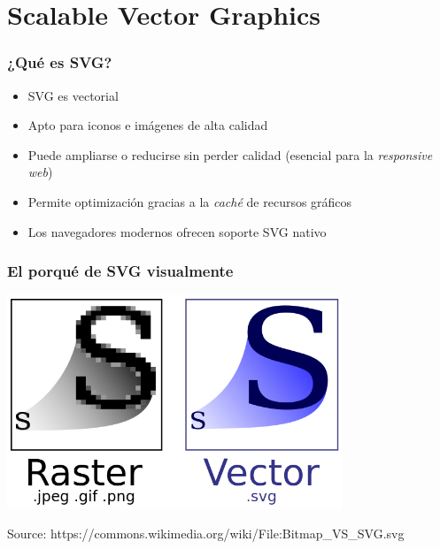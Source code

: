 \section{Scalable Vector Graphics}


\begin{frame}
\frametitle{¿Qué es SVG?}

\begin{itemize}
   \item SVG es vectorial
   \item Apto para iconos e imágenes de alta calidad
   \item Puede ampliarse o reducirse sin perder calidad (esencial para la \emph{responsive web})
   \item Permite optimización gracias a la \emph{caché} de recursos gráficos
   \item Los navegadores modernos ofrecen soporte SVG nativo
\end{itemize}

\end{frame}



\begin{frame}
\frametitle{El porqué de SVG visualmente}

\begin{center}
  \includegraphics[width=10cm]{figs/svg.png}
\end{center}


\begin{flushright}
{\tiny
Source: https://commons.wikimedia.org/wiki/File:Bitmap\_VS\_SVG.svg
}
\end{flushright}

\end{frame}

